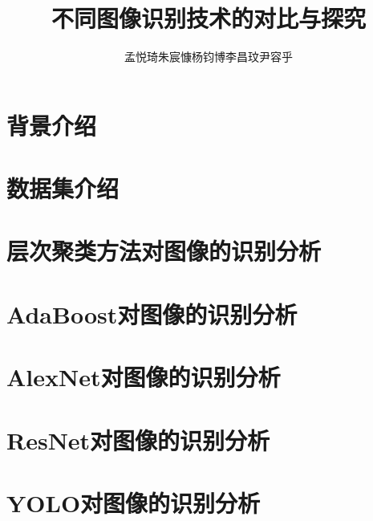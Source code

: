 \documentclass[UTF8]{ctexart}
\title{不同图像识别技术的对比与探究}
\author{孟悦琦\quad 朱宸慷\quad 杨钧博\quad 李昌玟\quad 尹容乎}
\begin{document}
\maketitle

\section{背景介绍}


\section{数据集介绍}



\section{层次聚类方法对图像的识别分析}



\section{AdaBoost对图像的识别分析}


\section{AlexNet对图像的识别分析}


\section{ResNet对图像的识别分析}


\section{YOLO对图像的识别分析}






\newpage
\small



\end{document}
